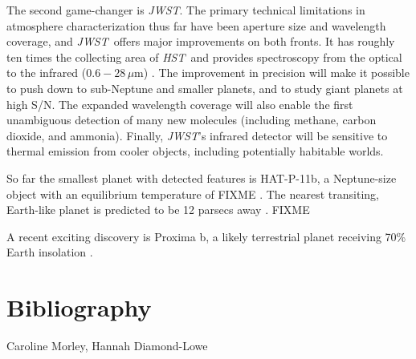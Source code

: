 \documentclass[graybox,natbib,nosecnum]{svmult}
\newcommand{\project}[1]{\textsl{#1}}
\newcommand{\JWST}{\project{JWST}}
\newcommand{\HST}{\project{HST}}
\begin{document}
The second game-changer is \JWST. The primary technical limitations in atmosphere characterization thus far have been aperture size and wavelength coverage, and \JWST\ offers major improvements on both fronts. It has roughly ten times the collecting area of \HST\, and provides spectroscopy from the optical to the infrared ($0.6 - 28\,\mu$m) \citep{FIXME}. The improvement in precision will make it possible to push down to sub-Neptune and smaller planets, and to study giant planets at high S/N. The expanded wavelength coverage will also enable the first unambiguous detection of many new molecules (including methane, carbon dioxide, and ammonia). Finally, \JWST's infrared detector will be sensitive to thermal emission from cooler objects, including potentially habitable worlds.


So far the smallest planet with detected features is HAT-P-11b, a Neptune-size object with an equilibrium temperature of FIXME \citep{fraine14}.
The nearest transiting, Earth-like planet is predicted to be 12 parsecs away \citep{dressing16}. FIXME

A recent exciting discovery is Proxima b, a likely terrestrial planet receiving 70\% Earth insolation \citep{anglada16}. 

\section{Bibliography}

\begin{acknowledgement}
Caroline Morley, Hannah Diamond-Lowe
\end{acknowledgement}

\end{document}
